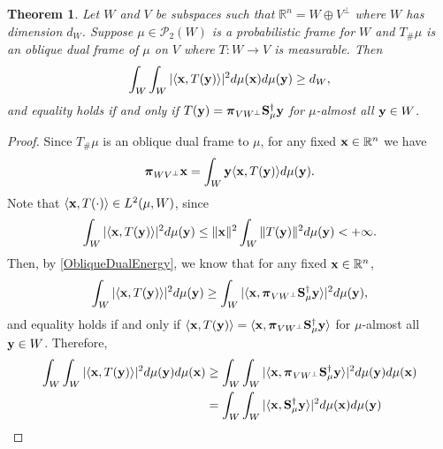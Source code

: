 \documentclass{amsart}
\numberwithin{equation}{section}
\newcommand{\bpi}{{\boldsymbol{\pi}}}
\theoremstyle{plain}
\newtheorem{theorem}{Theorem}[section]
\theoremstyle{remark}
\theoremstyle{definition}
\begin{document}
\begin{theorem}\label{DualFramePotential}
Let $W$ and $V$ be subspaces such that $\mathbb{R}^n = W \oplus V^\perp$ where $W$ has dimension $d_W$. Suppose $\mu \in \mathcal{P}_2(W)$ is a probabilistic frame for $W$ and  $T_{\#}\mu$ is an oblique dual frame of $\mu$ on $V$ where $T: W \rightarrow V$ is measurable. Then 
    \begin{equation*}
             \int_{W}  \int_{W}  |\langle {\bf x}, T({\bf y}) \rangle|^{2} d\mu({\bf x}) d\mu({\bf y}) \geq d_W,
    \end{equation*}
and equality holds if and only if $T({\bf y}) =  \bpi_{VW^\perp}{\bf S}_\mu^{\dagger}{\bf y}$ for $\mu$-almost all ${\bf y} \in W$.
\end{theorem}
\begin{proof}
Since $T_{\#}\mu$ is an oblique dual frame to $\mu$, for any fixed ${\bf x} \in \mathbb{R}^n$ we have
    \begin{equation*}
       \bpi_{WV^\perp} {\bf x} = \int_{W} {\bf y} \langle {\bf x}, T({\bf y}) \rangle  d\mu({\bf y}).
    \end{equation*}
    Note that $\langle {\bf x}, T(\cdot) \rangle \in L^2(\mu, W)$, since
    \begin{equation*}
        \int_{W} \vert \langle {\bf x}, T({\bf y}) \rangle \vert^2  d\mu({\bf y}) \leq \Vert {\bf x} \Vert^2    \int_{W} \Vert T({\bf y}) \Vert^2  d\mu({\bf y}) < +\infty. 
    \end{equation*}
    Then, by \cref{ObliqueDualEnergy}, we know that for any fixed ${\bf x} \in \mathbb{R}^n$,
    \begin{equation}\label{DualEnergy2}
         \int_{W}  |\langle {\bf x}, T({\bf y}) \rangle|^2  d\mu({\bf y}) 
          \geq  \int_{W}  |\langle {\bf x}, \bpi_{VW^\perp}{\bf S}_\mu^{\dagger}{\bf y} \rangle|^2  d\mu({\bf y}),
    \end{equation}
and equality holds if and only if $\langle {\bf x}, T({\bf y}) \rangle = \langle {\bf x}, \bpi_{VW^\perp}{\bf S}_\mu^{\dagger}{\bf y} \rangle$ for $\mu$-almost all ${\bf y} \in W$.
Therefore,
 \begin{align}
         \int_{W} \int_{W}  |\langle {\bf x}, T({\bf y}) \rangle|^2   d\mu({\bf y}) d\mu({\bf x}) 
       &\geq \int_{W} \int_{W}  |\langle {\bf x}, \bpi_{VW^\perp}{\bf S}_\mu^{\dagger}{\bf y} \rangle|^2  d\mu({\bf y}) d\mu({\bf x})\label{eqn:lowerbound} \\
       &=  \int_{W} \int_{W}  |\langle {\bf x}, {\bf S}_\mu^{\dagger}{\bf y} \rangle|^2 d\mu({\bf x}) d\mu({\bf y})\nonumber \\

\end{align}
\end{proof}
\end{document}
